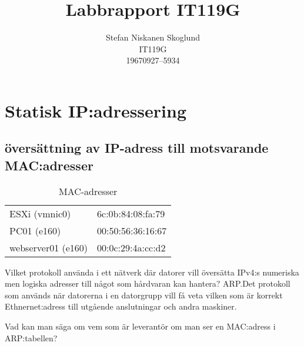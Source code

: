 \documentclass[11pt,a4paper]{article}
\title{Labbrapport IT119G}
\author{Stefan Niskanen Skoglund\\IT119G\\19670927--5934}
\begin{document}
\maketitle

\section{Statisk IP:adressering}\label{sec:statisk_ip_adressering}

\subsection{översättning av IP-adress till motsvarande MAC:adresser}\label{trans_ip_mac}

\begin{table}[ht]
  \centering
  \caption{MAC-adresser}
  \begin{tabu}{ll}
    \toprule
    ESXi (vmnic0)     &6c:0b:84:08:fa:79\\
    PC01 (e160)       &00:50:56:36:16:67\footnotemark[1]\\
    webserver01 (e160)&00:0c:29:4a:cc:d2\footnotemark[2]\\
    \bottomrule
  \end{tabu}
\end{table}

Vilket protokoll använda i ett nätverk där datorer vill översätta IPv4:s numeriska men logiska adresser
till något som hårdvaran kan hantera? ARP.\@ Det protokoll som används när datorerna i en datorgrupp vill få veta vilken som är korrekt
Ethnernet:adress till utgående anslutningar och andra maskiner.

Vad kan man säga om vem som är leverantör om man ser en MAC:adress i ARP:tabellen?
\end{document}

